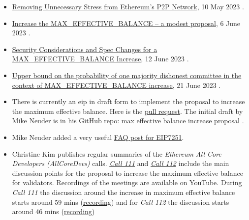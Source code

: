 \documentclass[UTF8]{article}
\begin{document}
\begin{itemize}
\item \href{https://ethresear.ch/t/removing-unnecessary-stress-from-ethereums-p2p-network/15547}{Removing Unnecessary Stress from Ethereum’s P2P Network}, 10 May 2023 \cite{Asgaonkar2023}.
\item \href{https://ethresear.ch/t/increase-the-max-effective-balance-a-modest-proposal/15801/3}{Increase the MAX\_EFFECTIVE\_BALANCE – a modest proposal}, 6 June 2023 \cite{Neuder2023a}.
\item \href{https://notes.ethereum.org/nHqON5l7SACkL\_nPwz8Vqw}{Security Considerations and Spec Changes for a MAX\_EFFECTIVE\_BALANCE Increase}, 12 June 2023 \cite{Neuder2023b}.
\item \href{https://hackmd.io/@0g8QuqEeQBe45CC8toURGw/HylpAVzIH2}{Upper bound on the probability of one majority dishonest committee in the context of MAX\_EFFECTIVE\_BALANCE increase}, 21 June 2023 \cite{Saltini2023}.
\item There is currently an \gls{eip} in draft form to implement the proposal to increase the maximum effective balance. Here is the \href{https://github.com/ethereum/EIPs/pull/7251/commits/ec37fceec914af2a3fd298ef6f6cc13b5d41c533#diff-0e923b63b339f877c14b995b0c69d4962489dce485fb0e31ef49a4dd303e0b56}{pull request}. The initial draft by Mike Neuder is in his GitHub repo: \href{https://github.com/michaelneuder/EIPs/blob/max-eb-increase/EIPS/eip-increase-maxeb.md}{max effective balance increase proposal} \cite{Neuder2023c}.
\item Mike Neuder added a very useful \href{https://notes.ethereum.org/@mikeneuder/eip-7251-faq}{FAQ post for EIP7251}.
\item Christine Kim publishes regular summaries of the \textit{Ethereum All Core Developers (AllCoreDevs)} calls. \href{https://www.galaxy.com/research/insights/ethereum-all-core-developers-consensus-call-111/}{\textit{Call 111}} and \href{https://www.galaxy.com/research/insights/ethereum-all-core-developers-consensus-call-112/}{\textit{Call 112}} include the main discussion points for the proposal to increase the maximum effective balance for validators. Recordings of the meetings are available on YouTube. During \textit{Call 111} the discussion around the increase in maximum effective balance starts around 59 mins (\href{https://youtu.be/ybgQuRcz9sg?t=3569}{recording}) and for \textit{Call 112} the discussion starts around 46 mins (\href{https://youtu.be/zdqtl9x\_UjA?t=2775}{recording})
\end{itemize}{

}
\end{document}
